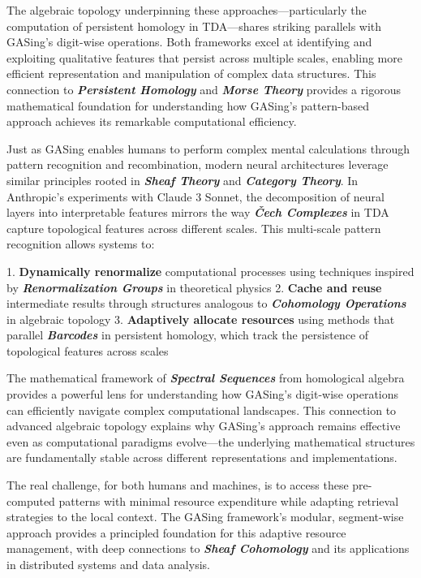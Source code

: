 The algebraic topology underpinning these approaches—particularly the computation of persistent homology in TDA—shares striking parallels with GASing's digit-wise operations. Both frameworks excel at identifying and exploiting qualitative features that persist across multiple scales, enabling more efficient representation and manipulation of complex data structures. This connection to \textbf{\textit{Persistent Homology}} and \textbf{\textit{Morse Theory}} provides a rigorous mathematical foundation for understanding how GASing's pattern-based approach achieves its remarkable computational efficiency.

Just as GASing enables humans to perform complex mental calculations through pattern recognition and recombination, modern neural architectures leverage similar principles rooted in \textbf{\textit{Sheaf Theory}} and \textbf{\textit{Category Theory}}. In Anthropic's experiments with Claude 3 Sonnet, the decomposition of neural layers into interpretable features mirrors the way \textbf{\textit{Čech Complexes}} in TDA capture topological features across different scales. This multi-scale pattern recognition allows systems to:

1. \textbf{Dynamically renormalize} computational processes using techniques inspired by \textbf{\textit{Renormalization Groups}} in theoretical physics
2. \textbf{Cache and reuse} intermediate results through structures analogous to \textbf{\textit{Cohomology Operations}} in algebraic topology
3. \textbf{Adaptively allocate resources} using methods that parallel \textbf{\textit{Barcodes}} in persistent homology, which track the persistence of topological features across scales

The mathematical framework of \textbf{\textit{Spectral Sequences}} from homological algebra provides a powerful lens for understanding how GASing's digit-wise operations can efficiently navigate complex computational landscapes. This connection to advanced algebraic topology explains why GASing's approach remains effective even as computational paradigms evolve—the underlying mathematical structures are fundamentally stable across different representations and implementations.

The real challenge, for both humans and machines, is to access these pre-computed patterns with minimal resource expenditure while adapting retrieval strategies to the local context. The GASing framework's modular, segment-wise approach provides a principled foundation for this adaptive resource management, with deep connections to \textbf{\textit{Sheaf Cohomology}} and its applications in distributed systems and data analysis.

